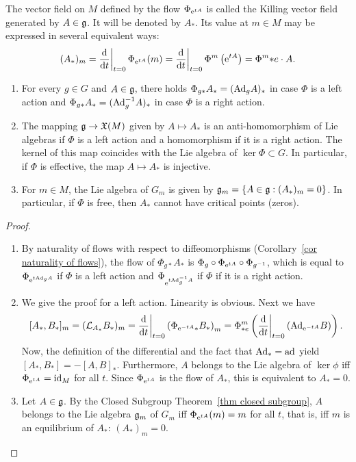 \begin{defn}
    The vector field on $M$ defined by the flow $\Phi_{\mathrm{e}^{tA}}$ is called the Killing vector field generated by $A\in\mathfrak{g}$. It will be denoted by $A_\ast$. Its value at $m\in M$ may be expressed in several equivalent ways:
    \[(A_\ast)_m=\restr{\frac{\dd}{\dd t}}{t=0}\Phi_{\rme^{tA}}(m)=\restr{\frac{\dd}{\dd t}}{t=0}\Phi^m\left(\rme^{tA}\right)=\Phi^m{\ast e}\cdot A.\label{eq 6.2.1 RS1}\]
\end{defn}

\begin{prop}[{{\cite[Prop.~6.2.2]{RS1}}}]\label{prop 6.2.2 RS1}
    \begin{enumerate}
        \item For every $g\in G$ and $A\in\mathfrak{g}$, there holds $\Phi_{g\ast}A_\ast=(\mathrm{Ad}_g A)_\ast$ in case $\Phi$ is a left action and $\Phi_{g\ast}A_\ast=(\mathrm{Ad}_g^{-1} A)_\ast$ in case $\Phi$ is a right action.
        \item The mapping $\mathfrak{g}\to \mathfrak{X}(M)$ given by $A\mapsto A_\ast$ is an anti-homomorphism of Lie algebras if $\Phi$ is a left action and a homomorphism if it is a right action. The kernel of this map coincides with the Lie algebra of $\ker\Phi\subset G$. In particular, if $\Phi$ is effective, the map $A\mapsto A_\ast$ is injective.
        \item For $m\in M$, the Lie algebra of $G_m$ is given by $\mathfrak{g}_m=\{A\in\mathfrak{g}:(A_\ast)_m=0\}$. In particular, if $\Phi$ is free, then $A_\ast$ cannot have critical points (zeros).
    \end{enumerate}
\end{prop}
\begin{proof}
    \begin{enumerate}
        \item By naturality of flows with respect to diffeomorphisms (Corollary~\ref{cor naturality of flows}), the flow of $\Phi_{g\ast}A_\ast$ is $\Phi_g\circ \Phi_{\mathrm{e}^{tA}}\circ \Phi_{g^{-1}}$, which is equal to $\Phi_{\mathrm{e}^{t\mathrm{Ad}_g A}}$ if $\Phi$ is a left action and $\Phi_{\mathrm{e}^{t\mathrm{Ad}_g^{-1} A}}$ if $\Phi$ if it is a right action.
        \item We give the proof for a left action. Linearity is obvious. Next we have
        \[[A_\ast,B_\ast]_m=(\Lie_{A_\ast}B_\ast)_m=\restr{\frac{\dd}{\dd t}}{t=0}\left(\Phi_{\rme^{-tA}\ast}B_\ast\right)_m=\Phi^m_{\ast e}\left(\restr{\frac{\dd}{\dd t}}{t=0}\left(\Ad_{\rme^{-tA}}B\right)\right).\]
        Now, the definition of the differential and the fact that $\mathrm{Ad}_\ast=\mathrm{ad}$ yield $[A_\ast,B_\ast]=-[A,B]_\ast$. Furthermore, $A$ belongs to the Lie algebra of $\ker\phi$ iff $\Phi_{\mathrm{e}^{tA}}=\operatorname{id}_M$ for all $t$. Since $\Phi_{\mathrm{e}^{tA}}$ is the flow of $A_\ast$, this is equivalent to $A_\ast=0$.
        \item Let $A\in\mathfrak{g}$. By the Closed Subgroup Theorem~\ref{thm closed subgroup}, $A$ belongs to the Lie algebra $\mathfrak{g}_m$ of $G_m$ iff $\Phi_{\mathrm{e}^{tA}}(m)=m$ for all $t$, that is, iff $m$ is an equilibrium of $A_\ast$: $(A_{\ast})_{m}=0$.
 \end{enumerate}
\end{proof}

